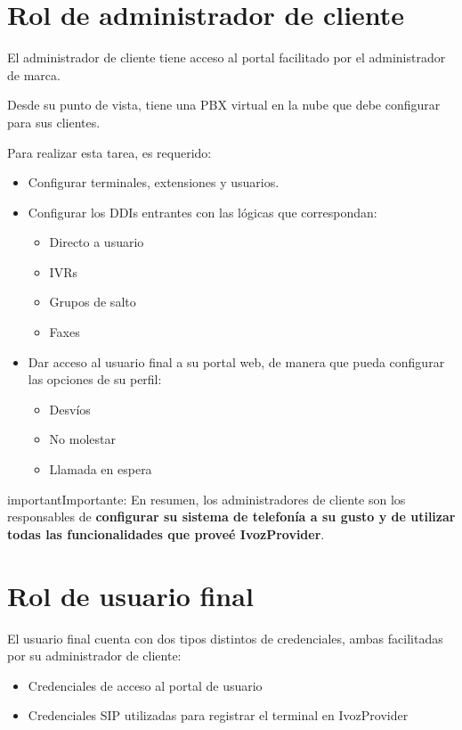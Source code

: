 \documentclass[letterpaper,10pt,spanish]{sphinxmanual}
\begin{document}
\section{Rol de administrador de cliente}
\label{basic_concepts/operation_roles/index:client-administrator-role}
El administrador de cliente tiene acceso al portal facilitado por el administrador de marca.

Desde su punto de vista, tiene una PBX virtual en la nube que debe configurar para sus clientes.

Para realizar esta tarea, es requerido:
\begin{itemize}
\item {} 
Configurar terminales, extensiones y usuarios.

\item {} 
Configurar los DDIs entrantes con las lógicas que correspondan:
\begin{itemize}
\item {} 
Directo a usuario

\item {} 
IVRs

\item {} 
Grupos de salto

\item {} 
Faxes

\end{itemize}

\item {} 
Dar acceso al usuario final a su portal web, de manera que pueda configurar las opciones de su perfil:
\begin{itemize}
\item {} 
Desvíos

\item {} 
No molestar

\item {} 
Llamada en espera

\end{itemize}

\end{itemize}

\begin{notice}{important}{Importante:}
En resumen, los administradores de cliente son los responsables de \textbf{configurar su sistema de telefonía a su gusto y de utilizar todas las funcionalidades que proveé IvozProvider}.
\end{notice}


\section{Rol de usuario final}
\label{basic_concepts/operation_roles/index:final-user-role}
El usuario final cuenta con dos tipos distintos de credenciales, ambas facilitadas por su administrador de cliente:
\begin{itemize}
\item {} 
Credenciales de acceso al portal de usuario

\item {} 
Credenciales SIP utilizadas para registrar el terminal en IvozProvider

\end{itemize}
\end{document}
